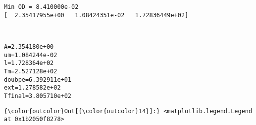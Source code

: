 \documentclass[11pt]{article}
\begin{document}
    \begin{Verbatim}[commandchars=\\\{\}]
Min OD = 8.410000e-02
[  2.35417955e+00   1.08424351e-02   1.72836449e+02]

    \end{Verbatim}

    \begin{center}
    \end{center}
    { \hspace*{\fill} \\}
    
    \begin{Verbatim}[commandchars=\\\{\}]
A=2.354180e+00
um=1.084244e-02
l=1.728364e+02
Tm=2.527128e+02
doubpe=6.392911e+01
ext=1.278582e+02
Tfinal=3.805710e+02

    \end{Verbatim}

            \begin{Verbatim}[commandchars=\\\{\}]
{\color{outcolor}Out[{\color{outcolor}14}]:} <matplotlib.legend.Legend at 0x1b2050f8278>
\end{Verbatim}
        
    \begin{center}
    \end{center}
    { \hspace*{\fill} \\}
    
    \begin{center}
    \end{center}
    { \hspace*{\fill} \\}
    
\end{document}
